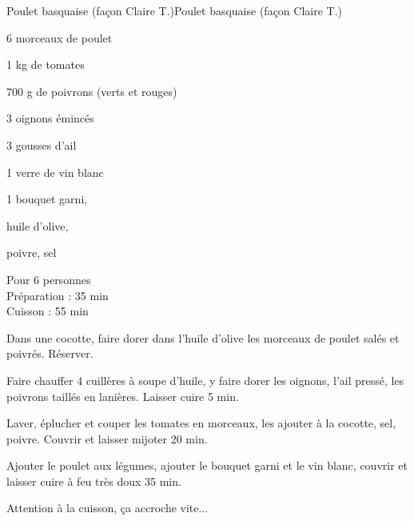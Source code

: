 \begin{recette}{Poulet basquaise (façon Claire T.)}{Poulet basquaise (façon Claire T.)}

\begin{ingredients}
6 morceaux de poulet \par
1 kg de tomates \par
700 g de poivrons (verts et rouges) \par
3 oignons émincés \par
3 gousses d'ail\par
1 verre de vin blanc\par
1 bouquet garni,\par
huile d'olive,\par
poivre, sel\par
\end{ingredients}

\begin{infos}
Pour 6 personnes\\
Préparation : 35 min\\
Cuisson : 55 min\\
\end{infos}

\begin{etapes}
\item Dans une cocotte, faire dorer dans l'huile d'olive les morceaux de poulet salés et poivrés. Réserver.
\item Faire chauffer 4 cuillères à soupe d'huile, y faire dorer les oignons, l'ail pressé, les poivrons taillés en lanières. Laisser cuire 5 min.
\item Laver, éplucher et couper les tomates en morceaux, les ajouter à la cocotte, sel, poivre. Couvrir et laisser mijoter 20 min.
\item Ajouter le poulet aux légumes, ajouter le bouquet garni et le vin blanc, couvrir et laisser cuire à feu très doux 35 min.
\end{etapes}

\begin{conseils}
Attention à la cuisson, ça accroche vite...
\end{conseils}

\end{recette}
